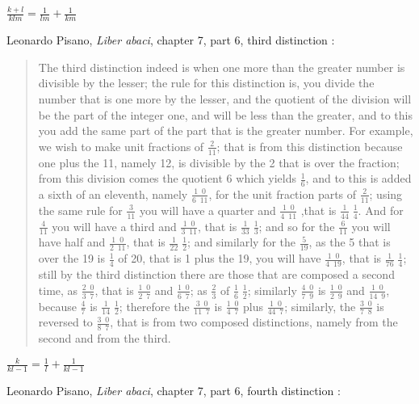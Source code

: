 \documentclass{article}
\theoremstyle{definition}
\begin{document}
$\frac{k+l}{klm} = \frac{1}{lm}+\frac{1}{km}$

Leonardo Pisano, {\em Liber abaci}, chapter 7, part 6, third distinction \cite[pp.~121--122]{abaci}:

\begin{quote}
The third distinction indeed is when one more than the greater number
is divisible by the lesser; the rule for this distinction is, you divide the number
that is one more by the lesser, and the quotient of the division will be the part of
the integer one, and will be less than the greater, and to this you add the same
part of the part that is the greater number. For example, we wish to make unit
fractions of $\frac{2}{11}$; that is from this distinction because one plus the 11, namely
12, is divisible by the 2 that is over the fraction; from this division comes the
quotient 6 which yields $\frac{1}{6}$, and to this is added a sixth of an eleventh, namely
$\frac{1 \enspace 0}{6 \enspace 11}$, for the unit fraction parts of $\frac{2}{11}$; using the same rule for $\frac{3}{11}$
you will have a
quarter and $\frac{1 \enspace 0}{4 \enspace 11}$ ,that is $\frac{1}{44} \; \frac{1}{4}$. And for $\frac{4}{11}$
you will have a third and $\frac{1 \enspace 0}{3 \enspace 11}$, that is
$\frac{1}{33} \; \frac{1}{3}$; and so for the $\frac{6}{11}$ you will have half and $\frac{1 \enspace 0}{2 \enspace 11}$,
that is $\frac{1}{22} \; \frac{1}{2}$; and similarly for
the $\frac{5}{19}$, as the 5 that is over the 19 is $\frac{1}{4}$ of 20, that is 1 plus the 19, you will have
$\frac{1 \enspace 0}{4 \enspace 19}$, that is $\frac{1}{76} \; \frac{1}{4}$;
still by the third distinction there are those that are composed
a second time, as $\frac{2 \enspace 0}{3 \enspace 7}$, that is $\frac{1 \enspace 0}{2 \enspace 7}$ and $\frac{1 \enspace 0}{6 \enspace 7}$;
as $\frac{2}{3}$ of $\frac{1}{6} \; \frac{1}{2}$; similarly $\frac{4 \enspace 0}{7 \enspace 9}$ is $\frac{1 \enspace 0}{2 \enspace 9}$
and $\frac{1 \enspace 0}{14 \enspace 9}$, because
$\frac{4}{7}$ is $\frac{1}{14} \; \frac{1}{2}$; therefore the $\frac{3 \enspace 0}{11 \enspace 7}$ is $\frac{1 \enspace 0}{4 \enspace 7}$
plus $\frac{1 \enspace 0}{44 \enspace 7}$; similarly, the $\frac{3 \enspace 0}{7 \enspace 8}$ is
reversed to $\frac{3 \enspace 0}{8 \enspace 7}$, that is from two composed distinctions, namely from the second
and from the third.
\end{quote}

$\frac{k}{kl-1} = \frac{1}{l} + \frac{1}{kl-1}$

Leonardo Pisano, {\em Liber abaci}, chapter 7, part 6, fourth distinction \cite[pp.~122--123]{abaci}:
\end{document}
